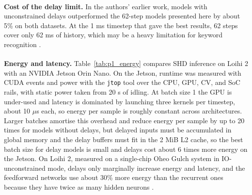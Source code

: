 \documentclass[12pt,a4paper,final]{extreport}
\begin{document}
\paragraph{} \textbf{Cost of the delay limit.} In the authors' earlier work, models with unconstrained delays outperformed the 62-step models presented here by about 5\% on both datasets. At the 1 ms timestep that gave the best results, 62 steps cover only 62 ms of history, which may be a heavy limitation for keyword recognition \cite{p1}.

\paragraph{} \textbf{Energy and latency.} Table~\ref{tab:p1_energy} compares SHD inference on Loihi 2 with an NVIDIA Jetson Orin Nano. On the Jetson, runtime was measured with CUDA events and power with the \texttt{jtop} tool over the CPU, GPU, CV, and SoC rails, with static power taken from 20 s of idling. At batch size 1 the GPU is under-used and latency is dominated by launching three kernels per timestep, about 10 $\mu$s each, so energy per sample is roughly constant across architectures. Larger batches amortise this overhead and reduce energy per sample by up to 20 times for models without delays, but delayed inputs must be accumulated in global memory and the delay buffers must fit in the 2 MiB L2 cache, so the best batch size for delay models is small and delays cost about 6 times more energy on the Jetson. On Loihi 2, measured on a single-chip Oheo Gulch system in IO-unconstrained mode, delays only marginally increase energy and latency, and the feedforward networks use about 30\% more energy than the recurrent ones because they have twice as many hidden neurons \cite{p1}.
\end{document}
